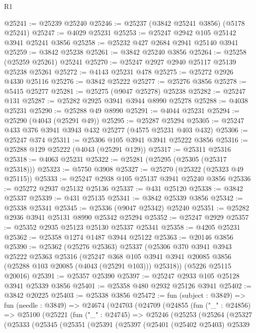 \begin{lexlean}{R1}
\begin{coremodule}
@25241 := @25239 @25240
@25246 := @25237 (@3842 @25241 @3856) (@5178 @25241)
@25247 := @4029 @25231
@25253 := @25247 @2942 @105 @25142 @3941 @25241 @3856
@25258 := @25232 @427 @2684 @2941 @25140 @3941
@25259 := @3842 @25238
@25261 := @3842 @25240 @3856
@25264 := @25258 (@25259 @25261) @25241
@25270 := @25247 @2927 @2940 @25117 @25139 @25238 @25261
@25272 := @4143 @25231 @478
@25275 := @25272 @2926 @4330 @25116
@25276 := @3842 @25222
@25277 := @25276 @3856
@25278 := @5415 @25277
@25281 := @25275 (@9047 @25278) @25238
@25282 := @25247 @131
@25287 := @25282 @2925 @3941 @3944 @8990 @25278
@25288 := @4038 @25231
@25290 := @25288 @49 @8990
@25291 := @4044 @25231
@25294 := @25290 (@4043 (@25291 @49))
@25295 := @25287 @25294
@25305 := @25247 @433 @376 @3941 @3943 @432 @25277 (@4575 @25231 @403 @432)
@25306 := @25247 @374
@25311 := @25306 @105 @3941 @3941 @25222 @3856
@25316 := @25288 @129 @25222 (@4043 (@25291 @129))
@25317 := @25311 @25316
@25318 := @4063 @25231
@25322 := @25281 (@25295 (@25305 (@25317 @25318)))
@25323 := @5750 @3908
@25327 := @25270 (@25322 (@25323 @49 @25115))
@25333 := @25247 @2938 @105 @25137 @3941 @25240 @3856
@25336 := @25272 @2937 @25132 @25136
@25337 := @431 @25120
@25338 := @3842 @25337
@25339 := @431 @25135
@25341 := @3842 @25339 @3856
@25342 := @25338 @25341
@25345 := @25336 (@9047 @25342) @25240
@25351 := @25282 @2936 @3941 @25131 @8990 @25342 @25294
@25352 := @25247 @2929
@25357 := @25352 @2935 @25123 @25130 @25337 @25341
@25358 := @4205 @25231
@25362 := @25358 @1274 @1487 @3944 @25122
@25363 := @20146 @3856
@25390 := @25362
    (@25276 @25363)
    @25337
    (@25306
      @370
      @3941
      @3943
      @25222
      @25363
      @25316
      (@25247 @368 @105 @3941 @3941 @20085 @3856 (@25288 @103 @20085 (@4043 (@25291 @103))) @25318))
    (@5226 @25115 @20016)
@25391 := @25357 @25390
@25397 := @25247 @2933 @105 @25128 @3941 @25339 @3856
@25401 := @25358 @480 @2932 @25126 @3941
@25402 := @3842 @20225
@25403 := @25338 @3856
@25472 := fun (subject : @3849) =>
  fun (needle : @3849) =>
  @24674
    (@24703
      (@24709
        (@24855
          (fun ("_" : @24856) =>
          @25100
            (@25221
              (fun ("_" : @24745) =>
              @25246
                (@25253
                  (@25264
                    (@25327
                      (@25333
                        (@25345
                          (@25351
                            (@25391
                              (@25397
                                (@25401
                                  (@25402 @25403)
                                  @25339

\end{coremodule}
\end{lexlean}

